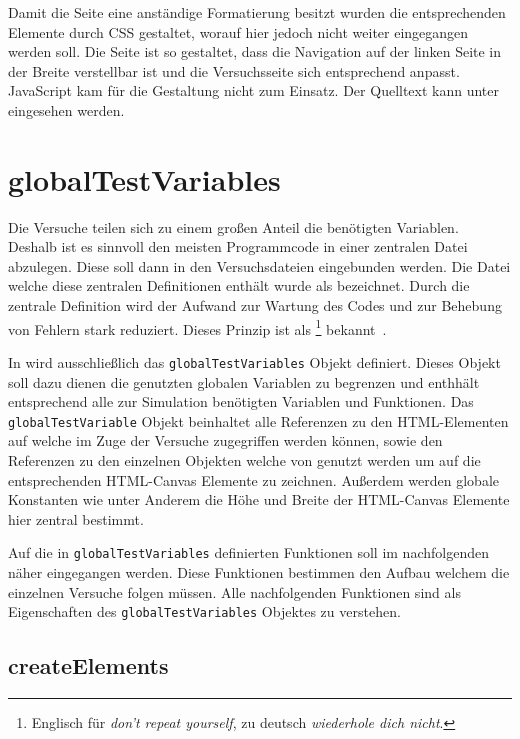 Damit die Seite eine anständige Formatierung besitzt wurden die entsprechenden Elemente durch CSS gestaltet, worauf hier jedoch nicht weiter eingegangen werden soll.
Die Seite ist so gestaltet, dass die Navigation auf der linken Seite in der Breite verstellbar ist und die Versuchsseite sich entsprechend anpasst.
JavaScript kam für die Gestaltung nicht zum Einsatz.
Der Quelltext kann unter  eingesehen werden.

\section{globalTestVariables}\label{ch:simulation_js}

Die Versuche teilen sich zu einem gro{\ss}en Anteil die benötigten Variablen.
Deshalb ist es sinnvoll den meisten Programmcode in einer zentralen Datei abzulegen.
Diese soll dann in den Versuchsdateien eingebunden werden.
Die Datei welche diese zentralen Definitionen enthält wurde als  bezeichnet.
Durch die zentrale Definition wird der Aufwand zur Wartung des Codes und zur Behebung von Fehlern stark reduziert.
Dieses Prinzip ist als \footnote{Englisch für \textit{don't repeat yourself}, zu deutsch \textit{wiederhole dich nicht}.} bekannt~\cite{AndrewHunt2021}.

In  wird ausschlie{\ss}lich das \lstinline{globalTestVariables} Objekt definiert.
Dieses Objekt soll dazu dienen die genutzten globalen Variablen zu begrenzen und enthhält entsprechend alle zur Simulation benötigten Variablen und Funktionen.
Das \lstinline{globalTestVariable} Objekt beinhaltet alle Referenzen zu den HTML-Elementen auf welche im Zuge der Versuche zugegriffen werden können, sowie den Referenzen zu den einzelnen  Objekten welche von  genutzt werden um auf die entsprechenden HTML-Canvas Elemente zu zeichnen.
Au{\ss}erdem werden globale Konstanten wie unter Anderem die Höhe und Breite der HTML-Canvas Elemente hier zentral bestimmt.

Auf die in \lstinline{globalTestVariables} definierten Funktionen soll im nachfolgenden näher eingegangen werden.
Diese Funktionen bestimmen den Aufbau welchem die einzelnen Versuche folgen müssen.
Alle nachfolgenden Funktionen sind als Eigenschaften des \lstinline{globalTestVariables} Objektes zu verstehen.

\subsection{createElements}\label{ch:gtv_createElements}

